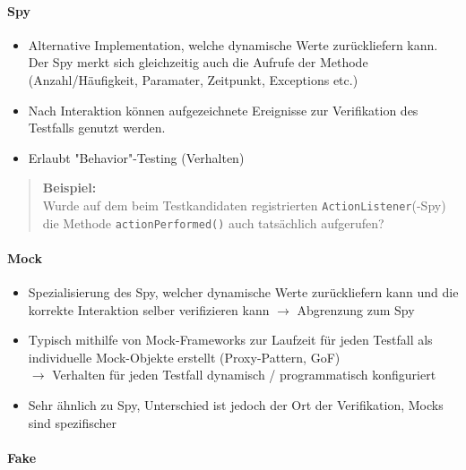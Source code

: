 \documentclass[a4paper]{article}
\begin{document}
			\paragraph{Spy}
			
				\begin{itemize}
					\item Alternative Implementation, welche dynamische Werte zurückliefern kann.
					Der Spy merkt sich gleichzeitig auch die Aufrufe der Methode\\
					(Anzahl/Häufigkeit, Paramater, Zeitpunkt, Exceptions etc.)
					\item Nach Interaktion können aufgezeichnete Ereignisse zur Verifikation des Testfalls genutzt werden.
					\item Erlaubt "Behavior"-Testing (Verhalten)
				\end{itemize}
				\begin{quote}
					\textbf{Beispiel:}\\
					Wurde auf dem beim Testkandidaten registrierten \texttt{ActionListener}(-Spy)\\
					die Methode \texttt{actionPerformed()} auch tatsächlich aufgerufen?
				\end{quote}
			
			\paragraph{Mock}
			
				\begin{itemize}
					\item Spezialisierung des Spy, welcher dynamische Werte zurückliefern kann und die korrekte Interaktion selber verifizieren kann $\rightarrow$ Abgrenzung zum Spy
					\item Typisch mithilfe von Mock-Frameworks zur Laufzeit für jeden Testfall als individuelle Mock-Objekte erstellt (Proxy-Pattern, GoF)\\
					$\rightarrow$ Verhalten für jeden Testfall dynamisch / programmatisch konfiguriert
					\item Sehr ähnlich zu Spy, Unterschied ist jedoch der Ort der Verifikation, Mocks sind spezifischer
				\end{itemize}
			
			\newpage
			
			\paragraph{Fake}
			
\end{document}
